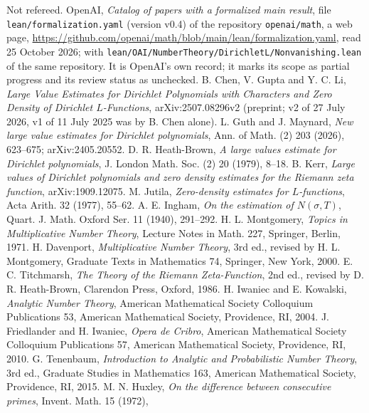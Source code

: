   Not refereed.
 OpenAI, \emph{Catalog of papers with a formalized main result}, file
  \texttt{lean/formalization.yaml} (version v0.4) of the repository \texttt{openai/math}, a web page,
  \url{https://github.com/openai/math/blob/main/lean/formalization.yaml}, read 25 October 2026; with
  \texttt{lean/OAI/NumberTheory/DirichletL/Nonvanishing.lean} of the same repository. It is OpenAI's own record; it
  marks its scope as partial progress and its review status as unchecked.
 B. Chen, V. Gupta and Y. C. Li, \emph{Large Value Estimates for Dirichlet Polynomials with Characters
  and Zero Density of Dirichlet $L$-Functions}, arXiv:2507.08296v2 (preprint; v2 of 27 July 2026, v1 of 11 July 2025
  was by B. Chen alone).
 L. Guth and J. Maynard, \emph{New large value estimates for Dirichlet polynomials},
  Ann. of Math. (2) 203 (2026), 623--675; arXiv:2405.20552.
 D. R. Heath-Brown, \emph{A large values estimate for Dirichlet polynomials}, J. London Math. Soc. (2) 20
  (1979), 8--18.
 B. Kerr, \emph{Large values of Dirichlet polynomials and zero density estimates for the Riemann zeta
  function}, arXiv:1909.12075.
 M. Jutila, \emph{Zero-density estimates for $L$-functions}, Acta Arith. 32 (1977), 55--62.
 A. E. Ingham, \emph{On the estimation of $N(\sigma, T)$}, Quart. J. Math. Oxford Ser. 11 (1940),
  291--292.
 H. L. Montgomery, \emph{Topics in Multiplicative Number Theory}, Lecture Notes in Math.
  227, Springer, Berlin, 1971.
 H. Davenport, \emph{Multiplicative Number Theory}, 3rd ed., revised by H. L. Montgomery, Graduate
  Texts in Mathematics 74, Springer, New York, 2000.
 E. C. Titchmarsh, \emph{The Theory of the Riemann Zeta-Function}, 2nd ed., revised by D. R.
  Heath-Brown, Clarendon Press, Oxford, 1986.
 H. Iwaniec and E. Kowalski, \emph{Analytic Number Theory}, American Mathematical Society
  Colloquium Publications 53, American Mathematical Society, Providence, RI, 2004.
 J. Friedlander and H. Iwaniec, \emph{Opera de Cribro}, American Mathematical Society
  Colloquium Publications 57, American Mathematical Society, Providence, RI, 2010.
 G. Tenenbaum, \emph{Introduction to Analytic and Probabilistic Number Theory}, 3rd ed., Graduate
  Studies in Mathematics 163, American Mathematical Society, Providence, RI, 2015.
 M. N. Huxley, \emph{On the difference between consecutive primes}, Invent. Math. 15 (1972),
